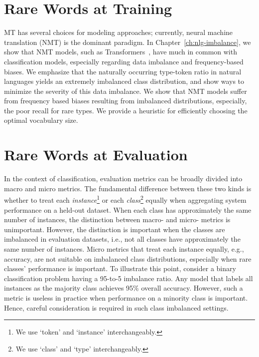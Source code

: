 \section*{Rare Words at Training}
MT has several choices for modeling approaches; currently, neural machine translation (NMT) is the dominant paradigm.
In Chapter~\ref{ch:nlg-imbalance}, we show that NMT models, such as  Transformers~\cite{vaswani-2017-attention}, have much in common with classification models, especially regarding data imbalance and frequency-based biases. 
We emphasize that the naturally occurring type-token ratio in natural languages yields an extremely imbalanced class distribution, and show ways to minimize the severity of this data imbalance.
We show that NMT models suffer from frequency based biases resulting from imbalanced distributions, especially, the poor recall for rare types.  
We provide a heuristic for efficiently choosing the optimal vocabulary size.


\section*{Rare Words at Evaluation}

In the context of classification, evaluation metrics can be broadly divided into macro and micro metrics.
The fundamental difference between these two kinds is whether to treat each \textit{instance}\footnote{We use `token' and `instance' interchangeably.} or each \textit{class}\footnote{We use `class' and `type' interchangeably.} equally when aggregating system performance on a held-out dataset.  
When each class has approximately the same number of instances, the distinction between macro- and micro- metrics is unimportant. 
However, the distinction is important when the classes are imbalanced in evaluation datasets, i.e., not all classes have approximately the same number of instances. 
Micro metrics that treat each instance equally, e.g., accuracy, are not suitable on imbalanced class distributions, especially when rare classes' performance is important.
To illustrate this point, consider a binary classification problem having a 95-to-5 imbalance ratio. 
Any model that labels all instances as the majority class achieves 95\% overall accuracy. However, such a metric is useless in practice when performance on a minority class is important. 
Hence, careful consideration is required in such class imbalanced settings.

